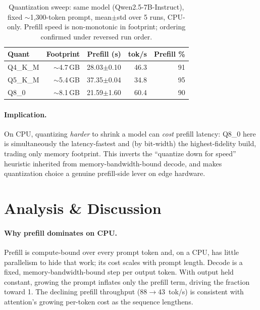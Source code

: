 \documentclass[10pt,twocolumn]{article}
\begin{document}
\begin{table}[t]
  \centering
  \caption{Quantization sweep: same model (Qwen2.5-7B-Instruct), fixed
  $\sim$1{,}300-token prompt, mean$\pm$std over 5 runs, CPU-only. Prefill
  speed is non-monotonic in footprint; ordering confirmed under reversed
  run order.}
  \label{tab:quant}
  \small
  \begin{tabular}{lrrrr}
    \toprule
    Quant & Footprint & Prefill (s) & tok/s & Prefill \% \\
    \midrule
    Q4\_K\_M & $\sim$4.7\,GB & 28.03$\pm$0.10 & 46.3 & 91 \\
    Q5\_K\_M & $\sim$5.4\,GB & 37.35$\pm$0.04 & 34.8 & 95 \\
    Q8\_0    & $\sim$8.1\,GB & 21.59$\pm$1.60 & 60.4 & 90 \\
    \bottomrule
  \end{tabular}
\end{table}

\paragraph{Implication.}
On CPU, quantizing \emph{harder} to shrink a model can \emph{cost} prefill
latency: Q8\_0 here is simultaneously the latency-fastest and (by bit-width)
the highest-fidelity build, trading only memory footprint. This inverts the
``quantize down for speed'' heuristic inherited from memory-bandwidth-bound
decode, and makes quantization choice a genuine prefill-side lever on edge
hardware.

\section{Analysis \& Discussion}
\label{sec:discussion}

\paragraph{Why prefill dominates on CPU.}
Prefill is compute-bound over every prompt token and, on a CPU, has little
parallelism to hide that work; its cost scales with prompt length. Decode
is a fixed, memory-bandwidth-bound step per output token. With output held
constant, growing the prompt inflates only the prefill term, driving the
fraction toward 1. The declining prefill throughput
(88$\rightarrow$43~tok/s) is consistent with attention's growing per-token
cost as the sequence lengthens.
\end{document}
